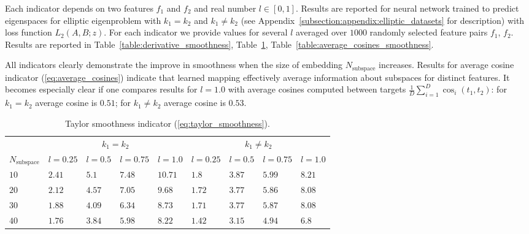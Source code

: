 \documentclass{article}
\begin{document}
Each indicator depends on two features $f_1$ and $f_2$ and real number $l\in[0, 1]$. Results are reported for neural network trained to predict eigenspaces for elliptic eigenproblem with $k_1=k_2$ and $k_1\neq k_2$ (see Appendix~\ref{subsection:appendix:elliptic_datasets} for description) with loss function $L_2(A, B; z)$. For each indicator we provide values for several $l$ averaged over $1000$ randomly selected feature pairs $f_1$, $f_2$. Results are reported in Table~\ref{table:derivative_smoothness}, Table~\ref{table:taylor_smoothness}, Table~\ref{table:average_cosines_smoothness}.

All indicators clearly demonstrate the improve in smoothness when the size of embedding $N_{\text{subspace}}$ increases. Results for average cosine indicator (\ref{eq:average_cosines}) indicate that learned mapping effectively average information about subspaces for distinct features. It becomes especially clear if one compares results for $l=1.0$ with average cosines computed between targets $\frac{1}{D}\sum_{i=1}^{D} \cos_{i}(t_1, t_2)$: for $k_1=k_2$ average cosine is $0.51$; for $k_1\neq k_2$ average cosine is $0.53$.

\begin{table}[h!]
\caption{Taylor smoothness indicator (\ref{eq:taylor_smoothness}).}
\label{table:taylor_smoothness}
\begin{center}
\hspace*{-0.5cm}  
\begin{tabular}{lllllllll}
\toprule
& \multicolumn{4}{c}{$k_1=k_2$} &  \multicolumn{4}{c}{$k_1\neq k_2$}\\
\cmidrule(r){2-5}\cmidrule(r){6-9}
$N_{\text{subspace}}$ & $l=0.25$ & $l=0.5$ & $l=0.75$ & $l=1.0$ & $l=0.25$ & $l=0.5$ & $l=0.75$ & $l=1.0$ \\
\midrule
$10$ & $2.41$ & $5.1$ & $7.48$ & $10.71$ &  $1.8$ & $3.87$ & $5.99$ & $8.21$\\
$20$ & $2.12$ & $4.57$ & $7.05$ & $9.68$ &  $1.72$ & $3.77$ & $5.86$ & $8.08$\\
$30$ & $1.88$ & $4.09$ & $6.34$ & $8.73$ &  $1.71$ & $3.77$ & $5.87$ & $8.08$\\
$40$ & $1.76$ & $3.84$ & $5.98$ & $8.22$ &  $1.42$ & $3.15$ & $4.94$ & $6.8$\\
\bottomrule
\end{tabular}
\end{center}
\end{table}
\end{document}

